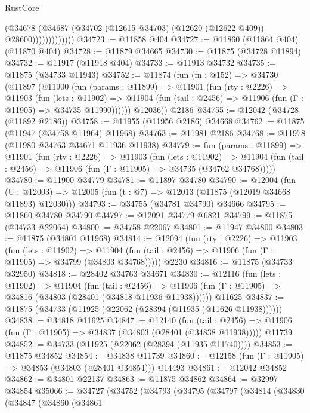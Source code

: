 \begin{lexlean}{RustCore}
\begin{coremodule}
                        (@34678
                          (@34687 (@34702 (@12615 @34703) (@12620 (@12622 @409)) @28600)))))))))))))
@34723 := @11858 @404
@34727 := @11860 (@11864 @404) (@11870 @404)
@34728 := @11879 @34665
@34730 := @11875 (@34728 @11894)
@34732 := @11917 (@11918 @404)
@34733 := @11913 @34732
@34735 := @11875 (@34733 @11943)
@34752 := @11874
    (fun (fn : @152) =>
    @34730
      (@11897
        (@11900
          (fun (params : @11899) =>
          @11901
            (fun (rty : @2226) =>
            @11903
              (fun (lets : @11902) =>
              @11904 (fun (tail : @2456) => @11906 (fun (Γ : @11905) => @34735 @11990))))))
        @12036))
    @2186
@34755 := @12042 (@34728 (@11892 @2186))
@34758 := @11955 (@11956 @2186) @34668
@34762 := @11875 (@11947 (@34758 @11964) @11968)
@34763 := @11981 @2186
@34768 := @11978 (@11980 @34763 @34671 @11936 @11938)
@34779 := fun (params : @11899) =>
  @11901
    (fun (rty : @2226) =>
    @11903
      (fun (lets : @11902) =>
      @11904 (fun (tail : @2456) => @11906 (fun (Γ : @11905) => @34735 (@34762 @34768)))))
@34780 := @11900 @34779
@34781 := @11897 @34780
@34790 := @12004
    (fun (U : @12003) => @12005 (fun (t : @7) => @12013 (@11875 (@12019 @34668 @11893) @12030)))
@34793 := @34755 (@34781 @34790) @34666
@34795 := @11860 @34780 @34790
@34797 := @12091 @34779 @6821
@34799 := @11875 (@34733 @22064)
@34800 := @34758 @22067
@34801 := @11947 @34800
@34803 := @11875 (@34801 @11968)
@34814 := @12094
    (fun (rty : @2226) =>
    @11903
      (fun (lets : @11902) =>
      @11904 (fun (tail : @2456) => @11906 (fun (Γ : @11905) => @34799 (@34803 @34768)))))
    @2230
@34816 := @11875 (@34733 @32950)
@34818 := @28402 @34763 @34671
@34830 := @12116
    (fun (lets : @11902) =>
    @11904
      (fun (tail : @2456) =>
      @11906 (fun (Γ : @11905) => @34816 (@34803 (@28401 (@34818 @11936 @11938))))))
    @11625
@34837 := @11875 (@34733 (@11925 (@22062 (@28394 (@11935 (@11626 @11938))))))
@34838 := @34818 @11625
@34847 := @12140
    (fun (tail : @2456) => @11906 (fun (Γ : @11905) => @34837 (@34803 (@28401 (@34838 @11938)))))
    @11739
@34852 := @34733 (@11925 (@22062 (@28394 (@11935 @11740))))
@34853 := @11875 @34852
@34854 := @34838 @11739
@34860 := @12158 (fun (Γ : @11905) => @34853 (@34803 (@28401 @34854))) @14493
@34861 := @12042 @34852
@34862 := @34801 @22137
@34863 := @11875 @34862
@34864 := @32997 @34854
@35066 := @34727
    (@34752
      (@34793
        (@34795
          (@34797
            (@34814
              (@34830
                (@34847
                  (@34860
                    (@34861

\end{coremodule}
\end{lexlean}
